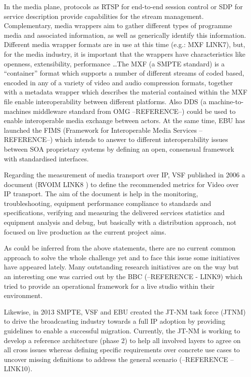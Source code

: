 In the media plane, protocols as RTSP for end-to-end session control or SDP for service description provide capabilities for the stream management. Complementary, media wrappers aim to gather different types of programme media and associated information, as well as generically identify this information. Different media wrapper formats are in use at this time (e.g.: MXF LINK7), but, for the media industry, it is important that the wrappers have characteristics like openness, extensibility, performance \ldots The MXF (a SMPTE standard) is a “container” format which supports a number of different streams of coded based, encoded in any of a variety of video and audio compression formats, together with a metadata wrapper which describes the material contained within the MXF file enable interoperability
between different platforms. Also DDS (a machine-to-machines middleware standard from OMG --REFERENCE--) could be used to enable interoperable media exchange between actors. At the same time, EBU has launched the FIMS (Framework for Interoperable Media Services --REFERENCE--) which intends to answer to different interoperability issues between SOA proprietary systems by defining an open, consensual framework with standardised interfaces.

Regarding the measurement of media transport over IP, VSF published in 2006 a document (RVOIM LINK8 ) to define the recommended metrics for Video over IP transport. The aim of the document is help in the monitoring, troubleshooting, equipment performance compliance to standards and specifications, verifying and measuring the delivered services statistics and equipment analysis and debug, but basically with a distribution approach, not focused on live production as the current project aims.

As could be inferred from the above statements, there are no current common approach to solve the whole challenge yet and to face this issue some initiatives have appeared lately. Many outstanding research initiatives are on the way but an interesting one was carried out by the BBC (--REFERENCE - LINK9) which tried to provide an operational framework for a live studio within their environment.

Likewise, in 2013 SMPTE, VSF and EBU created the JT-NM task force (JTNM) to drive the broadcasting industry towards a full IP adoption by providing guidelines to enable a successful migration. Currently, the JT-NM is working to develop a reference architecture (phase 2) to help all involved layers to agree on all cross issues whereas defining specific requirements over concrete use cases to uncover missing definitions to address the general scenario (--REFERENCE -- LINK10).

